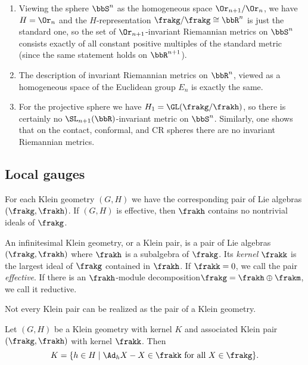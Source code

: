 \begin{example}
    \begin{enumerate}
        \item Viewing the sphere $\bbS^n$ as the homogeneous space $\Or_{n+1}\slash \Or_n$, we have $H=\Or_n$ and the $H$-representation $\frakg\slash\frakg\cong\bbR^n$ is just the standard one, so the set of $\Or_{n+1}$-invariant Riemannian metrics on $\bbS^n$ consists exactly of all constant positive multiples of the standard metric (since the same statement holds on $\bbR^{n+1}$).
        \item The description of invariant Riemannian metrics on $\bbR^n$, viewed as a homogeneous space of the Euclidean group $E_n$ is exactly the same. 
        \item For the projective sphere we have $H_1=\GL(\frakg\slash\frakh)$, so there is certainly no $\SL_{n+1}(\bbR)$-invariant metric on $\bbS^n$. Similarly, one shows that on the contact, conformal, and CR spheres there are no invariant Riemannian metrics.
    \end{enumerate}
\end{example}




\subsection{Local gauges}

For each Klein geometry $(G,H)$ we have the corresponding pair of Lie algebras $(\frakg,\frakh)$. If $(G,H)$ is effective, then $\frakh$ contains no nontrivial ideals of $\frakg$.

\begin{defn}
    An infinitesimal Klein geometry, or a Klein pair, is a pair of Lie algebras $(\frakg,\frakh)$ where $\frakh$ is a subalgebra of $\frakg$. Its \emph{kernel} $\frakk$ is the largest ideal of $\frakg$ contained in $\frakh$. If $\frakk=0$, we call the pair \emph{effective}. If there is an $\frakh$-module decomposition$\frakg=\frakh\oplus\frakm$, we call it reductive.
\end{defn}


Not every Klein pair can be realized as the pair of a Klein geometry.

\begin{thm}\label{thm 4.1 Sharpe}
    Let $(G,H)$ be a Klein geometry with kernel $K$ and associated Klein pair $(\frakg,\frakh)$ with kernel $\frakk$. Then 
    \[K=\{h\in H\mid \Ad_h X-X\in\frakk \text{ for all }X\in\frakg\}.\]
\end{thm}

